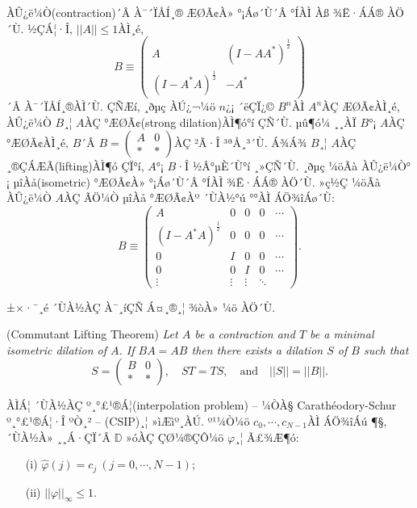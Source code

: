 \documentclass[12pt,a4paper,2sided]{article}
\newcommand{\vs}{\vspace}
\begin{document}

\vspace{.8 cm} \noindent ÀÛ¿ë¼Ò(contraction)´Â À¯´ÏÅÍ¸® ÆØÃ¢À»
°¡Áø´Ù´Â °ÍÀÌ Àß ¾Ë·ÁÁ® ÀÖ´Ù. ½ÇÁ¦·Î, $||A||\le 1$ÀÌ¸é,
$$
B\equiv
\begin{pmatrix} A&(I-AA^*)^{\frac{1}{2}}\\(I-A^*A)^{\frac{1}{2}}&-A^*\end{pmatrix}
$$
´Â À¯´ÏÅÍ¸®ÀÌ´Ù. ÇÑÆí, ¸ðµç ÀÚ¿¬¼ö $n$¿¡ ´ëÇÏ¿© $B^n$ÀÌ $A^n$ÀÇ
ÆØÃ¢ÀÌ¸é, ÀÛ¿ë¼Ò $B$¸¦ $A$ÀÇ °­ÆØÃ¢(strong dilation)ÀÌ¶ó°í ÇÑ´Ù.
µû¶ó¼­ ¸¸ÀÏ $B$°¡ $A$ÀÇ °­ÆØÃ¢ÀÌ¸é, $B$´Â $B=\begin{pmatrix} A &0\\
*&*\end{pmatrix}$ÀÇ ²Ã·Î ³ªÅ¸³­´Ù. Á¾Á¾ $B$¸¦ $A$ÀÇ
¸®ÇÁÆÃ(lifting)ÀÌ¶ó ÇÏ°í, $A$°¡ $B$·Î ½Â°­µÈ´Ù°í ¸»ÇÑ´Ù. ¸ðµç ¼öÃà
ÀÛ¿ë¼Ò°¡ µîÀå(isometric) °­ÆØÃ¢À» °¡Áø´Ù´Â °ÍÀÌ ¾Ë·ÁÁ® ÀÖ´Ù. »ç½Ç
¼öÃà ÀÛ¿ë¼Ò $A$ÀÇ ÃÖ¼Ò µîÀå °­ÆØÃ¢Àº ´ÙÀ½°ú °°ÀÌ ÁÖ¾îÁø´Ù:
$$
B\equiv
\begin{pmatrix}A&0&0&0&\cdots\\
(I-A^*A)^{\frac{1}{2}}&0&0&0&\cdots\\
0&I&0&0&\cdots\\
0&0&I&0&\cdots\\
\vdots&\vdots&\vdots&\ddots&
\end{pmatrix}.
$$

±×·¯¸é  ´ÙÀ½ÀÇ À¯¸íÇÑ Á¤¸®¸¦ ¾òÀ» ¼ö ÀÖ´Ù.


\vs{0.2cm}{\bf Theorem 3.2.1.} (Commutant Lifting Theorem) {\rm
\cite[p.658]{GGK}} {\sl  Let $A$ be a contraction and $T$ be a
minimal isometric dilation of $A$. If $BA=AB$ then there exists a
dilation $S$ of $B$ such that}
$$
S=\begin{pmatrix} B &0\\ *&*\end{pmatrix},\quad ST=TS,\quad \mbox{and}\quad ||S||=||B||.
$$


ÀÌÁ¦ ´ÙÀ½ÀÇ º¸°£¹®Á¦(interpolation problem) -- ¼ÒÀ§ Carath\'
eodory-Schur º¸°£¹®Á¦·Î ºÒ¸² -- (CSIP)¸¦ »ìÆìº¸ÀÚ. º¹¼Ò¼ö $c_0,
\cdots, c_{N-1}$ÀÌ ÁÖ¾îÁú ¶§, ´ÙÀ½À» ¸¸Á·ÇÏ´Â $\mathbb{D}$ »óÀÇ
ÇØ¼®ÇÔ¼ö $\varphi$¸¦ Ã£¾Æ¶ó:
\begin{itemize}
\item[(i)] $\widehat{\varphi}(j)=c_j\ (j=0,\cdots, N-1)$;
\item[(ii)] $||\varphi||_{\infty}\le 1$.
\end{itemize}
\end{document}
